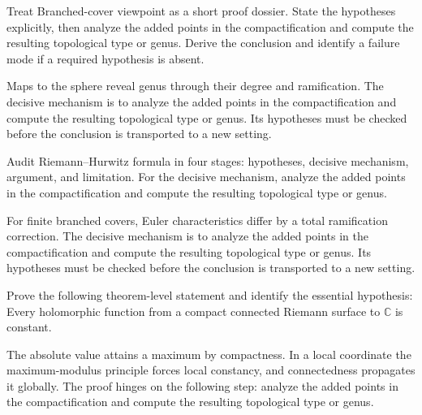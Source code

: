 \begin{problem}\label{prob:iv26-problem-07}
Treat Branched-cover viewpoint as a short proof dossier. State the hypotheses explicitly, then analyze the added points in the compactification and compute the resulting topological type or genus. Derive the conclusion and identify a failure mode if a required hypothesis is absent.
\end{problem}
\begin{solution}
Maps to the sphere reveal genus through their degree and ramification. The decisive mechanism is to analyze the added points in the compactification and compute the resulting topological type or genus. Its hypotheses must be checked before the conclusion is transported to a new setting.
\end{solution}

\begin{problem}\label{prob:iv26-problem-08}
Audit Riemann--Hurwitz formula in four stages: hypotheses, decisive mechanism, argument, and limitation. For the decisive mechanism, analyze the added points in the compactification and compute the resulting topological type or genus.
\end{problem}
\begin{solution}
For finite branched covers, Euler characteristics differ by a total ramification correction. The decisive mechanism is to analyze the added points in the compactification and compute the resulting topological type or genus. Its hypotheses must be checked before the conclusion is transported to a new setting.
\end{solution}

\begin{problem}\label{prob:iv26-problem-09}
Prove the following theorem-level statement and identify the essential hypothesis: Every holomorphic function from a compact connected Riemann surface to $\mathbb C$ is constant.
\end{problem}
\begin{solution}
The absolute value attains a maximum by compactness. In a local coordinate the maximum-modulus principle forces local constancy, and connectedness propagates it globally. The proof hinges on the following step: analyze the added points in the compactification and compute the resulting topological type or genus.
\end{solution}

